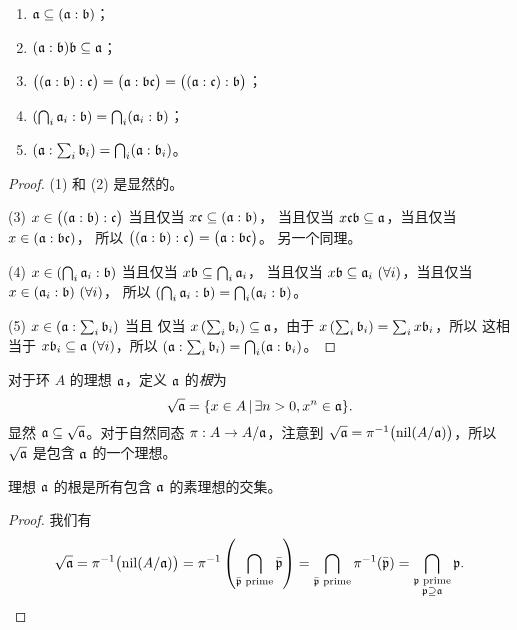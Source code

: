 \begin{proposition}
  \mbox{}
  \begin{enumerate}
    \item $\mathfrak{a}\subseteq (\mathfrak{a}:\mathfrak{b})$；
    \item $(\mathfrak{a}:\mathfrak{b})\mathfrak{b}\subseteq \mathfrak{a}$；
    \item $\bigl((\mathfrak{a}:\mathfrak{b}):\mathfrak{c}\bigr)=\bigl(\mathfrak{a}:\mathfrak{b}\mathfrak{c}\bigr)
    =\bigl((\mathfrak{a}:\mathfrak{c}):\mathfrak{b}\bigr)$；
    \item $\left(\bigcap_i\mathfrak{a}_i:\mathfrak{b}\right)=\bigcap_i(\mathfrak{a}_i:\mathfrak{b})$；
    \item $\left(\mathfrak{a}:\sum_i\mathfrak{b}_i\right)=\bigcap_i(\mathfrak{a}:\mathfrak{b}_i)$。
  \end{enumerate}
\end{proposition}
\begin{proof}
  (1) 和 (2) 是显然的。

  (3) $x\in\bigl((\mathfrak{a}:\mathfrak{b}):\mathfrak{c}\bigr)$ 当且仅当 $x\mathfrak{c}\subseteq(\mathfrak{a}:\mathfrak{b})$，
  当且仅当 $x\mathfrak{c}\mathfrak{b}\subseteq\mathfrak{a}$，当且仅当 $x\in(\mathfrak{a}:\mathfrak{bc})$，
  所以 $\bigl((\mathfrak{a}:\mathfrak{b}):\mathfrak{c}\bigr)=\bigl(\mathfrak{a}:\mathfrak{b}\mathfrak{c}\bigr)$。
  另一个同理。

  (4) $x\in\left(\bigcap_i\mathfrak{a}_i:\mathfrak{b}\right)$ 当且仅当 $x\mathfrak{b}\subseteq\bigcap_i\mathfrak{a}_i$，
  当且仅当 $x\mathfrak{b}\subseteq \mathfrak{a}_i\ (\forall i)$，当且仅当 $x\in(\mathfrak{a}_i:\mathfrak{b})\ (\forall i)$，
  所以 $\left(\bigcap_i\mathfrak{a}_i:\mathfrak{b}\right)=\bigcap_i(\mathfrak{a}_i:\mathfrak{b})$。

  (5) $x\in\left(\mathfrak{a}:\sum_i\mathfrak{b}_i\right)$ 当且
  仅当 $x\left(\sum_i\mathfrak{b}_i\right)\subseteq\mathfrak{a}$，由于
  $x\left(\sum_i\mathfrak{b}_i\right)=\sum_i x\mathfrak{b}_i$，所以
  这相当于 $x\mathfrak{b}_i\subseteq \mathfrak{a}\ (\forall i)$，所以
  $\left(\mathfrak{a}:\sum_i\mathfrak{b}_i\right)=\bigcap_i(\mathfrak{a}:\mathfrak{b}_i)$。
\end{proof}

对于环 $A$ 的理想 $\mathfrak{a}$，定义 $\mathfrak{a}$ 的\emph{根}为
\[
  \sqrt{\mathfrak{a}}=\{x\in A\,|\, \exists n>0, x^n\in \mathfrak{a}\}  .
\]
显然 $\mathfrak{a}\subseteq\sqrt{\mathfrak{a}}$。对于自然同态 $\pi:A\to A/\mathfrak{a}$，注意到
$\sqrt{\mathfrak{a}}=\pi^{-1}\bigl(\operatorname{nil}(A/\mathfrak{a})\bigr)$，所以 $\sqrt{\mathfrak{a}}$ 是包含
$\mathfrak{a}$ 的一个理想。

\begin{proposition}
  理想 $\mathfrak{a}$ 的根是所有包含 $\mathfrak{a}$ 的素理想的交集。
\end{proposition}
\begin{proof}
  我们有
  \[
    \sqrt{\mathfrak{a}}=\pi^{-1}\bigl(\operatorname{nil}(A/\mathfrak{a})\bigr)  
    =\pi^{-1}\left(\bigcap_{\text{$\bar{\mathfrak{p}}$ prime}}\bar{\mathfrak{p}}\right)
    =\bigcap_{\text{$\bar{\mathfrak{p}}$ prime}}\pi^{-1}(\bar{\mathfrak{p}})
    =\bigcap_{\substack{\text{$\mathfrak{p}$ prime}\\\mathfrak{p}\supseteq\mathfrak{a}}}
    \mathfrak{p}.\qedhere
  \]
\end{proof}

